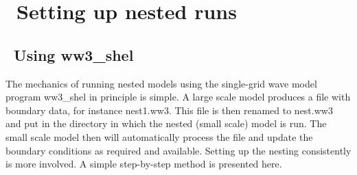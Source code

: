 \pagestyle{myheadings} \setcounter{page}{1} \setcounter{footnote}{0}

\section{~Setting up nested runs} \label{app:nest}
\newcounters 
\vssub
\subsection{~Using {\file ww3\_shel}}
\vssub

The mechanics of running nested models using the single-grid wave model
program {\file ww3\_shel} in principle is simple. A large scale model produces
a file with boundary data, for instance {\file nest1.ww3}. This file is then
renamed to {\file nest.ww3} and put in the directory in which the nested
(small scale) model is run. The small scale model then will automatically
process the file and update the boundary conditions as required and
available. Setting up the nesting consistently is more involved. A simple
step-by-step method is presented here.


